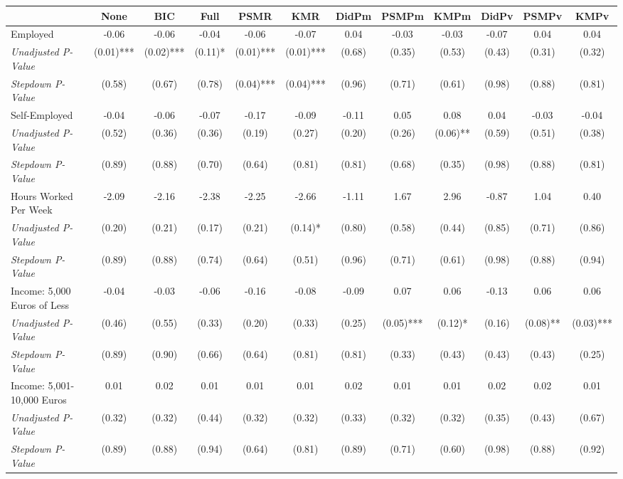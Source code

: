 \begin{tabular}{l c c c c c c c c c c c}
\toprule
 & None & BIC & Full & PSMR & KMR & DidPm & PSMPm & KMPm & DidPv & PSMPv & KMPv \\
\midrule
Employed & -0.06 & -0.06 & -0.04 & -0.06 & -0.07 & 0.04 & -0.03 & -0.03 & -0.07 & 0.04 & 0.04 \\
\quad \textit{Unadjusted P-Value} & (0.01)*** & (0.02)*** & (0.11)* & (0.01)*** & (0.01)*** & (0.68) & (0.35) & (0.53) & (0.43) & (0.31) & (0.32) \\
\quad \textit{Stepdown P-Value} & (0.58) & (0.67) & (0.78) & (0.04)*** & (0.04)*** & (0.96) & (0.71) & (0.61) & (0.98) & (0.88) & (0.81) \\
Self-Employed & -0.04 & -0.06 & -0.07 & -0.17 & -0.09 & -0.11 & 0.05 & 0.08 & 0.04 & -0.03 & -0.04 \\
\quad \textit{Unadjusted P-Value} & (0.52) & (0.36) & (0.36) & (0.19) & (0.27) & (0.20) & (0.26) & (0.06)** & (0.59) & (0.51) & (0.38) \\
\quad \textit{Stepdown P-Value} & (0.89) & (0.88) & (0.70) & (0.64) & (0.81) & (0.81) & (0.68) & (0.35) & (0.98) & (0.88) & (0.81) \\
Hours Worked Per Week & -2.09 & -2.16 & -2.38 & -2.25 & -2.66 & -1.11 & 1.67 & 2.96 & -0.87 & 1.04 & 0.40 \\
\quad \textit{Unadjusted P-Value} & (0.20) & (0.21) & (0.17) & (0.21) & (0.14)* & (0.80) & (0.58) & (0.44) & (0.85) & (0.71) & (0.86) \\
\quad \textit{Stepdown P-Value} & (0.89) & (0.88) & (0.74) & (0.64) & (0.51) & (0.96) & (0.71) & (0.61) & (0.98) & (0.88) & (0.94) \\
Income: 5,000 Euros of Less & -0.04 & -0.03 & -0.06 & -0.16 & -0.08 & -0.09 & 0.07 & 0.06 & -0.13 & 0.06 & 0.06 \\
\quad \textit{Unadjusted P-Value} & (0.46) & (0.55) & (0.33) & (0.20) & (0.33) & (0.25) & (0.05)*** & (0.12)* & (0.16) & (0.08)** & (0.03)*** \\
\quad \textit{Stepdown P-Value} & (0.89) & (0.90) & (0.66) & (0.64) & (0.81) & (0.81) & (0.33) & (0.43) & (0.43) & (0.43) & (0.25) \\
Income: 5,001-10,000 Euros & 0.01 & 0.02 & 0.01 & 0.01 & 0.01 & 0.02 & 0.01 & 0.01 & 0.02 & 0.02 & 0.01 \\
\quad \textit{Unadjusted P-Value} & (0.32) & (0.32) & (0.44) & (0.32) & (0.32) & (0.33) & (0.32) & (0.32) & (0.35) & (0.43) & (0.67) \\
\quad \textit{Stepdown P-Value} & (0.89) & (0.88) & (0.94) & (0.64) & (0.81) & (0.89) & (0.71) & (0.60) & (0.98) & (0.88) & (0.92) \\

\end{tabular}
